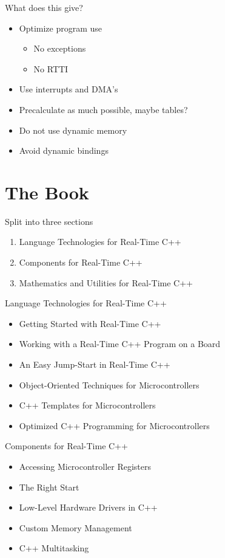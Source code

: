 \documentclass{beamer}
\begin{document}
\begin{frame}{What does this give?}
  \begin{itemize}
  \pause \item Optimize program use
    \begin{itemize}
    \item No exceptions
    \item No RTTI
    \end{itemize}
    \pause \item Use interrupts and DMA's
    \pause \item Precalculate as much possible, maybe tables?
    \pause \item Do not use dynamic memory
    \pause \item Avoid dynamic bindings
  \end{itemize}
\end{frame}

\section{The Book}

\begin{frame}{Split into three sections}
  \begin{enumerate}[I]
  \item Language Technologies for Real-Time C++
  \item Components for Real-Time C++
  \item Mathematics and Utilities for Real-Time C++
  \end{enumerate}
\end{frame}

\begin{frame}{Language Technologies for Real-Time C++}
  \begin{itemize}
  \item Getting Started with Real-Time C++
  \item Working with a Real-Time C++ Program on a Board
  \item An Easy Jump-Start in Real-Time C++
  \item Object-Oriented Techniques for Microcontrollers
  \item C++ Templates for Microcontrollers
  \item Optimized C++ Programming for Microcontrollers
  \end{itemize}
\end{frame}

\begin{frame}{Components for Real-Time C++}
  \begin{itemize}
  \item Accessing Microcontroller Registers
  \item The Right Start
  \item Low-Level Hardware Drivers in C++
  \item Custom Memory Management
  \item C++ Multitasking
  \end{itemize}
\end{frame}
\end{document}
